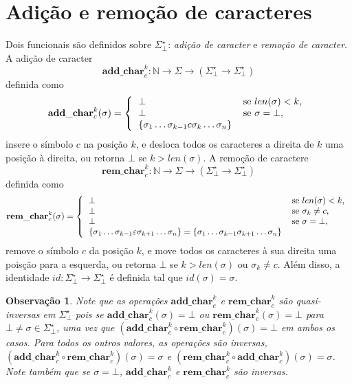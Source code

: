 \documentclass[a4paper]{article}
\newcommand{\baseset}{{\Sigma^\star_\bot}}
\newcommand{\addc}[2]{{\mathbf{add\_char}_{#1}^{#2}}}
\newcommand{\opa}{{\addc{c}{k}}}
\newcommand{\remc}[2]{{\mathbf{rem\_char}_{#1}^{#2}}}
\newcommand{\opb}{{\remc{c}{k}}}
\newcommand{\composition}{{\circ}}
\newcommand{\len}[1]{{len(#1)}}
\begin{document}
\section*{Adição e remoção de caracteres}
Dois funcionais são definidos sobre $\baseset$: {\it adição de caracter} e {\it remoção de caracter}. A adição de caracter
\begin{equation} \label{eq:oplus}
\opa: \mathbb{N} \to \Sigma \to (\baseset \to \baseset)
\end{equation}
definida como
\begin{equation} \label{eq:def_add}
\opa(\sigma) = \left\{
\begin{tabular}{ll}
$\bot$ & se $\len{\sigma} < k$,\\
$\bot$ & se $\sigma = \bot$, \\
$\{\sigma_1\ldots\sigma_{k-1}c\sigma_k\ldots\sigma_n\}$
\end{tabular}\right.
\end{equation}
insere o símbolo $c$ na posição $k$, e desloca todos os caracteres a direita de $k$ uma posição à direita, ou retorna $\bot$ se $k > \len{\sigma}$. A remoção de caractere
\begin{equation} \label{eq:ominus}
\opb: \mathbb{N} \to \Sigma \to (\baseset \to \baseset)
\end{equation}
definida como
\begin{equation} \label{eq:def_rem}
\opb(\sigma) = \left\{
\begin{tabular}{ll}
$\bot$ & se $\len{\sigma} < k$,\\
$\bot$ & se $\sigma_k \neq c$, \\
$\bot$ & se $\sigma = \bot$, \\
$\{\sigma_1\ldots\sigma_{k-1}\varepsilon\sigma_{k+1}\ldots\sigma_n\} = \{\sigma_1\ldots\sigma_{k-1}\sigma_{k+1}\ldots\sigma_n\}$
\end{tabular}\right.
\end{equation}
remove o símbolo $c$ da posição $k$, e move todos os caracteres à sua direita uma poisção para a esquerda, ou retorna $\bot$ se $k > \len{\sigma}$ ou $\sigma_k \neq c$.
Além disso, a identidade $id: \baseset \to \baseset$ é definida tal que $id(\sigma) = \sigma$.

\newtheorem{obs}{Observação}[section]
\begin{obs}
Note que as operações $\opa$ e $\opb$ são quasi-inversas em $\baseset$ pois se $\opa(\sigma) = \bot$ ou $\opb(\sigma) = \bot$ para $\bot \neq \sigma \in \baseset$, uma vez que $(\opa \composition \opb)(\sigma) = \bot$ em ambos os casos. Para todos os outros valores, as operações são inversas, $(\opa \composition \opb)(\sigma) = \sigma$ e $(\opb \composition \opa)(\sigma) = \sigma$. Note também que se $\sigma = \bot$, $\opa$ e $\opb$ são inversas.
\end{obs}
\end{document}
